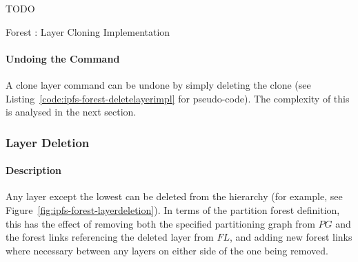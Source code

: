 TODO


\begin{stulisting}[p]
\caption{Forest : Layer Cloning Implementation}
\label{code:ipfs-forest-clonelayerimpl}

\end{stulisting}

\paragraph{Undoing the Command}

A clone layer command can be undone by simply deleting the clone (see Listing~\ref{code:ipfs-forest-deletelayerimpl} for pseudo-code). The complexity of this is analysed in the next section.

\subsubsection{Layer Deletion}

\paragraph{Description}

Any layer except the lowest can be deleted from the hierarchy (for example, see Figure~\ref{fig:ipfs-forest-layerdeletion}). In terms of the partition forest definition, this has the effect of removing both the specified partitioning graph from $\textit{PG}$ and the forest links referencing the deleted layer from $\textit{FL}$, and adding new forest links where necessary between any layers on either side of the one being removed.

